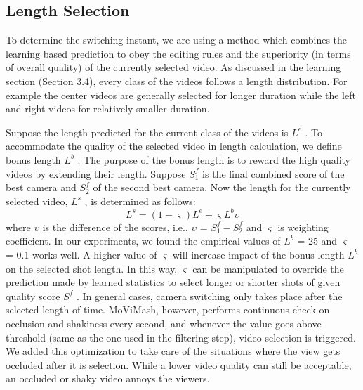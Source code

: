 \documentclass{sig-alternate-05-2015}
\begin{document}
\subsection{Length Selection}
To determine the switching instant, we are using a method which
combines the learning based prediction to obey the editing rules and
the superiority (in terms of overall quality) of the currently selected
video. As discussed in the learning section (Section 3.4), every
class of the videos follows a length distribution. For example the
center videos are generally selected for longer duration while the
left and right videos for relatively smaller duration.\par
Suppose the length predicted for the current class of the videos
is $L^e$ . To accommodate the quality of the selected video in length
calculation, we define bonus length $L^b$ . The purpose of the bonus
length is to reward the high quality videos by extending their length.
Suppose $S_1^f$ is the final combined score of the best camera and $S_2^f$
of the second best camera. Now the length for the currently selected
video, $L^s$ , is determined as follows:
\begin{equation}
    L^s=(1-\varsigma)L^e+\varsigma L^b\upsilon
\end{equation}
where $\upsilon$ is the difference of the scores, i.e., $\upsilon$ = $S^f_1-S^f_2$
and $\varsigma$ is
weighting coefficient. In our experiments, we found the empirical
values of $L^b$ = 25 and $\varsigma$ = 0.1 works well. A higher value of
$\varsigma$ will increase impact of the bonus length $L^b$ on the selected shot
length. In this way, $\varsigma$ can be manipulated to override the prediction
made by learned statistics to select longer or shorter shots of given
quality score $S^f$ .
In general cases, camera switching only takes place after the selected length of time. MoViMash, however, performs continuous
check on occlusion and shakiness every second, and whenever the
value goes above threshold (same as the one used in the filtering
step), video selection is triggered. We added this optimization to
take care of the situations where the view gets occluded after it is
selection. While a lower video quality can still be acceptable, an
occluded or shaky video annoys the viewers.
\end{document}
